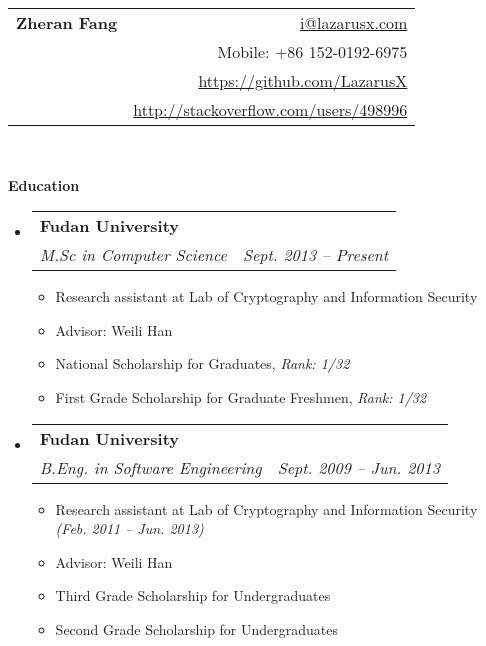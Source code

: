 \documentclass[letterpaper,10pt]{article}
\makeatletter
\newcommand{\resitem}[1]{\item #1 \vspace{-2pt}}
\newcommand{\resheading}[1]{{\large \colorbox{mygrey}{\begin{minipage}{\textwidth}{\textbf{#1 \vphantom{p\^{E}}}}\end{minipage}}}}
\newcommand{\ressubheading}[4]{
\begin{tabular*}{6.5in}{l@{\extracolsep{\fill}}r}
		\textbf{#1} & #2 \\
		#3 & #4 \\
\end{tabular*}\vspace{-6pt}}
\makeatother
\begin{document}
\newcommand{\mywebheader}{
\begin{tabular*}{7in}{l@{\extracolsep{\fill}}r}
	\textbf{{\Huge Zheran Fang}} & \href{mailto:i@lazarusx.com}{i@lazarusx.com}\\
     & {Mobile: +86 152-0192-6975}\\
     & \href{https://github.com/LazarusX}{https://github.com/LazarusX} \\
     & \href{http://stackoverflow.com/users/498996}{http://stackoverflow.com/users/498996} \\
	\end{tabular*}
\\
\vspace{0.1in}}

\mywebheader


\resheading{Education}
	\begin{itemize}
       \item
			\ressubheading{{Fudan University}}{}{\emph{M.Sc in Computer Science}}{\emph{Sept. 2013 -- Present}}
			{
				\begin{itemize}
                    
                    \resitem{Research assistant at Lab of Cryptography and Information Security}
                    \resitem{Advisor: Weili Han}
                    \resitem{National Scholarship for Graduates, \emph{Rank: 1/32}}
                    \resitem{First Grade Scholarship for Graduate Freshmen, \emph{Rank: 1/32}}
				\end{itemize}
			}


    \item
			\ressubheading{{Fudan University}}{}{\emph{B.Eng. in Software Engineering}}{\emph{Sept. 2009 -- Jun. 2013}}
			{
				\begin{itemize}
                    
                    \resitem{Research assistant at Lab of Cryptography and Information Security \emph{(Feb. 2011 -- Jun. 2013)}}
                    \resitem{Advisor: Weili Han}
                    \resitem{Third Grade Scholarship for Undergraduates}
                    \resitem{Second Grade Scholarship for Undergraduates}
				\end{itemize}
			}
	\end{itemize} %
\end{document}
